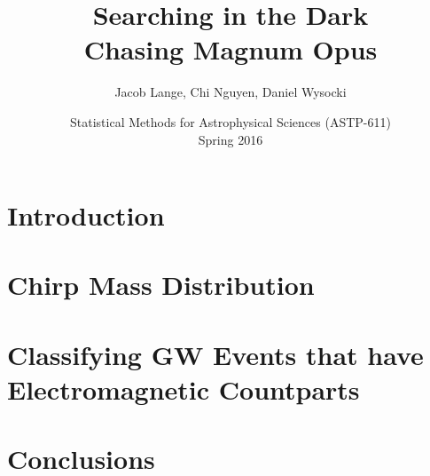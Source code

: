 \documentclass[12pt]{article}
\title{
Searching in the Dark
\\
Chasing Magnum Opus
}
\author{
  Jacob Lange, Chi Nguyen, Daniel Wysocki
}
\date{
  Statistical Methods for Astrophysical Sciences (ASTP-611)
  \\
  Spring 2016
}
\begin{document}
\maketitle


\section{Introduction}
\label{sec:intro}

\section{Chirp Mass Distribution}
\label{sec:dist}





\section{Classifying GW Events that have Electromagnetic Countparts}
\label{sec:classifier}


\section{Conclusions}
\label{sec:conclusions}

\end{document}

